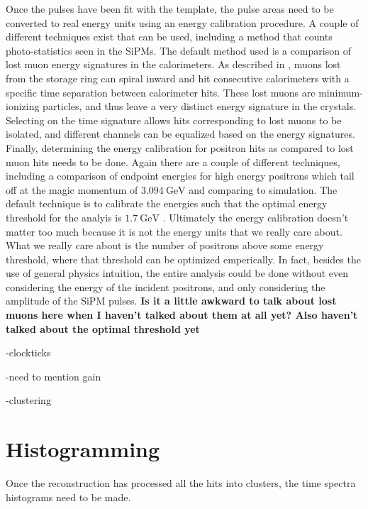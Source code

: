 Once the pulses have been fit with the template, the pulse areas need to be converted to real energy units using an energy calibration procedure. A couple of different techniques exist that can be used, including a method that counts photo-statistics seen in the SiPMs. The default method used is a comparison of lost muon energy signatures in the calorimeters. As described in , muons lost from the storage ring can spiral inward and hit consecutive calorimeters with a specific time separation between calorimeter hits. These lost muons are minimum-ionizing particles, and thus leave a very distinct energy signature in the crystals. Selecting on the time signature allows hits corresponding to lost muons to be isolated, and different channels can be equalized based on the energy signatures. Finally, determining the energy calibration for positron hits as compared to lost muon hits needs to be done. Again there are a couple of different techniques, including a comparison of endpoint energies for high energy positrons which tail off at the magic momentum of $\SI{3.094}{\GeV}$ and comparing to simulation. The default technique is to calibrate the energies such that the optimal energy threshold for the \wa analyis is $\SI{1.7}{\GeV}$ \cite{AFThesis}. Ultimately the energy calibration doesn't matter too much because it is not the energy units that we really care about. What we really care about is the number of positrons above some energy threshold, where that threshold can be optimized emperically. In fact, besides the use of general physics intuition, the entire \wa analysis could be done without even considering the energy of the incident positrons, and only considering the amplitude of the SiPM pulses. \textbf{Is it a little awkward to talk about lost muons here when I haven't talked about them at all yet? Also haven't talked about the optimal threshold yet}





-clockticks




-need to mention gain


-clustering




\section{Histogramming}
\label{sec:Histogramming}


Once the reconstruction has processed all the hits into clusters, the time spectra histograms need to be made.



